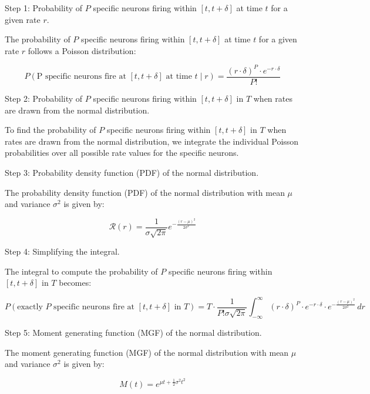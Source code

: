 Step 1: Probability of \( P \) specific neurons firing within \([t, t + \delta]\) at time \( t \) for a given rate \( r \).

The probability of \( P \) specific neurons firing within \([t, t + \delta]\) at time \( t \) for a given rate \( r \) follows a Poisson distribution:

\begin{equation}
P(\text{P specific neurons fire at } [t, t + \delta] \text{ at time } t \mid r) = \frac{{(r \cdot \delta)^P \cdot e^{-r \cdot \delta}}}{{P!}}
\end{equation}

Step 2: Probability of \( P \) specific neurons firing within \([t, t + \delta]\) in \( T \) when rates are drawn from the normal distribution.

To find the probability of \( P \) specific neurons firing within \([t, t + \delta]\) in \( T \) when rates are drawn from the normal distribution, we integrate the individual Poisson probabilities over all possible rate values for the specific neurons.

Step 3: Probability density function (PDF) of the normal distribution.

The probability density function (PDF) of the normal distribution with mean \( \mu \) and variance \( \sigma^2 \) is given by:

\begin{equation}
\mathcal{R}(r) = \frac{1}{\sigma \sqrt{2\pi}} e^{-\frac{(r-\mu)^2}{2\sigma^2}}
\end{equation}

Step 4: Simplifying the integral.

The integral to compute the probability of \( P \) specific neurons firing within \([t, t + \delta]\) in \( T \) becomes:

\begin{equation}
P(\text{exactly } P \text{ specific neurons fire at } [t, t + \delta] \text{ in } T) = T \cdot \frac{1}{P! \sigma \sqrt{2\pi}} \int_{-\infty}^{\infty} (r \cdot \delta)^P \cdot e^{-r \cdot \delta} \cdot e^{-\frac{(r-\mu)^2}{2\sigma^2}} \, dr
\end{equation}

Step 5: Moment generating function (MGF) of the normal distribution.

The moment generating function (MGF) of the normal distribution with mean \( \mu \) and variance \( \sigma^2 \) is given by:

\begin{equation}
M(t) = e^{\mu t + \frac{1}{2}\sigma^2 t^2}
\end{equation}


